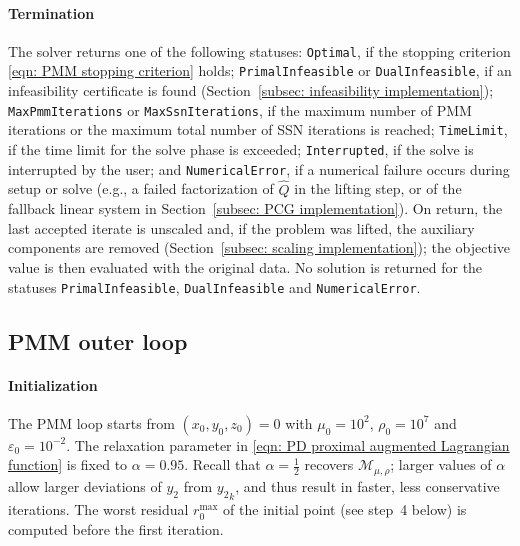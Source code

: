 \paragraph{Termination} The solver returns one of the following statuses:
\texttt{Optimal}, if the stopping criterion \eqref{eqn: PMM stopping criterion} holds;
\texttt{PrimalInfeasible} or \texttt{DualInfeasible}, if an infeasibility certificate is found (Section~\ref{subsec: infeasibility implementation});
\texttt{MaxPmmIterations} or \texttt{MaxSsnIterations}, if the maximum number of PMM iterations or the maximum total number of SSN iterations is reached;
\texttt{TimeLimit}, if the time limit for the solve phase is exceeded;
\texttt{Interrupted}, if the solve is interrupted by the user; and
\texttt{NumericalError}, if a numerical failure occurs during setup or solve (e.g., a failed factorization of $\hat{Q}$ in the lifting step, or of the fallback linear system in Section~\ref{subsec: PCG implementation}).
On return, the last accepted iterate is unscaled and, if the problem was lifted, the auxiliary components are removed (Section~\ref{subsec: scaling implementation}); the objective value is then evaluated with the original data. No solution is returned for the statuses \texttt{PrimalInfeasible}, \texttt{DualInfeasible} and \texttt{NumericalError}.


\subsection{PMM outer loop} \label{subsec: algorithm settings}

\paragraph{Initialization} The PMM loop starts from $(x_0,y_0,z_0) = 0$ with $\mu_0 = 10^2$, $\rho_0 = 10^7$ and $\varepsilon_0 = 10^{-2}$. The relaxation parameter in \eqref{eqn: PD proximal augmented Lagrangian function} is fixed to $\alpha = 0.95$. Recall that $\alpha = \frac{1}{2}$ recovers $\mathcal{M}_{\mu,\rho}$; larger values of $\alpha$ allow larger deviations of $y_2$ from ${y_2}_k$, and thus result in faster, less conservative iterations. The worst residual $r^{\max}_0$ of the initial point (see step~4 below) is computed before the first iteration.


